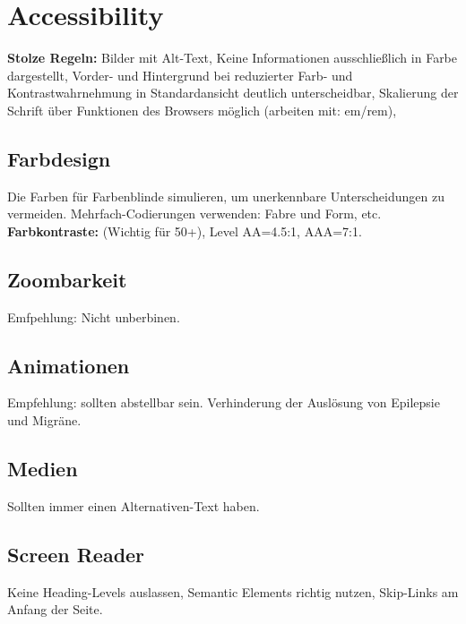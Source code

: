 
\section{Accessibility}
\textbf{Stolze Regeln:} Bilder mit Alt-Text, Keine Informationen ausschließlich in Farbe dargestellt, Vorder- und Hintergrund bei reduzierter Farb- und Kontrastwahrnehmung in Standardansicht deutlich unterscheidbar, Skalierung der Schrift über Funktionen des Browsers möglich (arbeiten mit: em/rem), 

\subsection{Farbdesign}
Die Farben für Farbenblinde simulieren, um unerkennbare Unterscheidungen zu vermeiden. Mehrfach-Codierungen verwenden: Fabre und Form, etc. \textbf{Farbkontraste:} (Wichtig für 50+), Level AA=4.5:1, AAA=7:1.

\subsection{Zoombarkeit}
Emfpehlung: Nicht unberbinen. 

\subsection{Animationen}
Empfehlung: sollten abstellbar sein. Verhinderung der Auslösung von Epilepsie und Migräne.

\subsection{Medien}
Sollten immer einen Alternativen-Text haben.

\subsection{Screen Reader}
Keine Heading-Levels auslassen, Semantic Elements richtig nutzen, Skip-Links am Anfang der Seite.